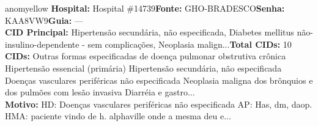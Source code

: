 \documentclass[a4paper,10pt]{article}
\begin{document}
\begin{anomalycard}[Interna\c{c}\~{a}o \#119394 | Pac. \#99013 | MODERADO (z=2.91) | LOS: 21d | 02/03/2026\,$\to$\,—]{anomyellow}
\textbf{Hospital:} Hospital \#14739\quad \textbf{Fonte:} GHO-BRADESCO\quad \textbf{Senha:} KAA8VW9\quad \textbf{Guia:} ---\\

\textbf{CID Principal:} {\small Hipertensão secundária, não especificada, Diabetes mellitus não-insulino-dependente - sem complicações, Neoplasia malign...}\quad\textbf{Total CIDs:} 10\\

\textbf{CIDs:} {\scriptsize Outras formas especificadas de doença pulmonar obstrutiva crônica \textbar{} Hipertensão essencial (primária) \textbar{} Hipertensão secundária, não especificada \textbar{} Doenças vasculares periféricas não especificada \textbar{} Neoplasia maligna dos brônquios e dos pulmões com lesão invasiva \textbar{} Diarréia e gastro...}\\

\textbf{Motivo:} {\scriptsize HD:  Doenças vasculares periféricas não especificada  AP: Has, dm, daop. HMA: paciente vindo de h. alphaville onde a mesma deu e...}\\



\end{anomalycard}
\end{document}
